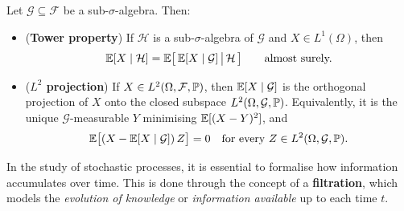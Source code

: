 \begin{proposition}\label{prop:towerl2}
Let $\mathcal{G} \subseteq \mathcal{F}$ be a sub-$\sigma$-algebra. Then:
\begin{itemize}
    \item[i)] (\textbf{Tower property}) If $\mathcal{H}$ is a sub-$\sigma$-algebra of $\mathcal{G}$ and $X \in L^1(\Omega)$, then
    \[
        \mathbb{E}[X \mid \mathcal{H}] = \mathbb{E}\bigl[\,\mathbb{E}[X \mid \mathcal{G}]\,\big|\,\mathcal{H}\,\bigr]
        \qquad \text{almost surely.}
    \]

    \item[ii)] (\textbf{$L^2$ projection}) If $X \in L^2(\Omega,\mathcal{F},\mathbb{P})$, then $\mathbb{E}[X \mid \mathcal{G}]$ is the orthogonal projection of $X$ onto the closed subspace $L^2(\Omega,\mathcal{G},\mathbb{P})$. Equivalently, it is the unique $\mathcal{G}$-measurable $Y$ minimising $\mathbb{E}[(X-Y)^2]$, and
    \[
        \mathbb{E}\bigl[(X - \mathbb{E}[X\mid\mathcal{G}])\,Z\bigr] = 0 \quad \text{for every } Z \in L^2(\Omega,\mathcal{G},\mathbb{P}).
    \]
\end{itemize}
\qedopen
\end{proposition}




In the study of stochastic processes, it is essential to formalise how information accumulates over time. This is done through the concept of a \textbf{filtration}, which models the \emph{evolution of knowledge} or \emph{information available} up to each time \(t\).

